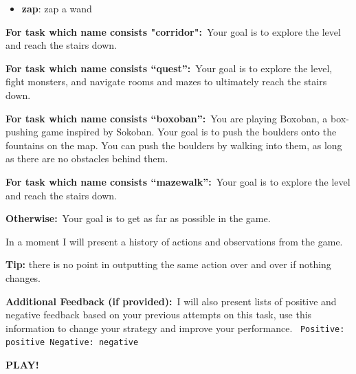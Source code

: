 \begin{MyGreenBox}
\begin{itemize}
		\item \textbf{zap}: zap a wand
	\end{itemize}

	\textbf{For task which name consists "corridor":}\
Your goal is to explore the level
	and reach the stairs down.

	\textbf{For task which name consists “quest”:}\
Your goal is to explore the
	level, fight monsters, and navigate rooms and mazes to ultimately reach the
	stairs down.

	\textbf{For task which name consists “boxoban”:}\
You are playing Boxoban, a
	box-pushing game inspired by Sokoban. Your goal is to push the boulders onto the
	fountains on the map. You can push the boulders by walking into them, as long as
	there are no obstacles behind them.

	\textbf{For task which name consists “mazewalk”:}\
Your goal is to explore the
	level and reach the stairs down.

	\textbf{Otherwise:}\
Your goal is to get as far as possible in the game.

	In a moment I will present a history of actions and observations from the game.

	\textbf{Tip:} there is no point in outputting the same action over and over if
	nothing changes.

	\textbf{Additional Feedback (if provided):}\
I will also present lists of positive
	and negative feedback based on your previous attempts on this task, use this
	information to change your strategy and improve your performance. \
\texttt{Positive:
	{positive}}\
\texttt{Negative: {negative}}

	\textbf{PLAY!}
\end{MyGreenBox}

